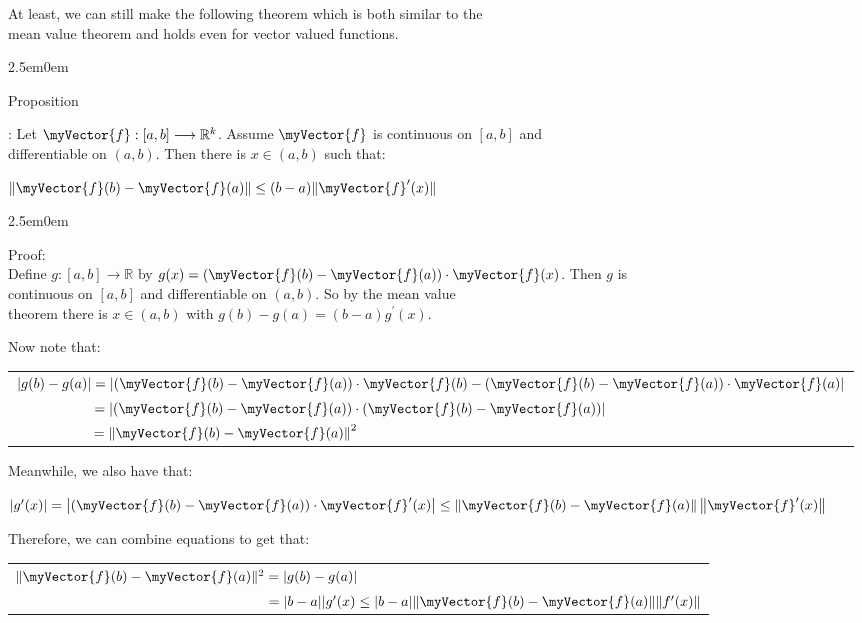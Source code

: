 \documentclass{book}
\newcommand{\hTwo}{%
   \color{MidnightBlue}%
   \fontsize{13}{15}\selectfont%
}
\newcommand{\hThree}{%
   \color{PineGreen!85!Orange}
   \fontsize{13}{15}\selectfont%
}
\newenvironment{myIndent}{%
   \begin{adjustwidth}{2.5em}{0em}%
}{%
   \end{adjustwidth}%
}
\newcounter{PropNumber}
\newcommand{\propCount}[1][1]{%
   \addtocounter{PropNumber}{#1}%
   \thePropNumber%
}
\newcommand{\retTwo}{\hfill\bigbreak}
\newcommand{\mVec}[1]{\myVector{#1}}
\begin{document}
At least, we can still make the following theorem which is both similar to the\\ mean value theorem and holds even for vector valued functions.
{\begin{myIndent}\hTwo
   Proposition \propCount: Let $\mVec{f}: [a, b] \longrightarrow \mathbb{R}^k$. Assume $\mVec{f}$ is continuous on $[a, b]$ and\\ differentiable on $(a, b)$. Then there is $x \in (a, b)$ such that:

   {\centering $\|\mVec{f}(b) - \mVec{f}(a)\| \leq (b-a)\|\mVec{f}^\prime(x)\|$\retTwo\par}

   {\begin{myIndent}\hThree
      Proof:\\
      Define $g: [a, b] \longrightarrow \mathbb{R}$ by $g(x) = (\mVec{f}(b) - \mVec{f}(a)) \cdot \mVec{f}(x)$. Then $g$ is\\ continuous on $[a, b]$ and differentiable on $(a, b)$. So by the mean value\\ theorem there is $x \in (a, b)$ with $g(b) - g(a) = (b-a)g^\prime(x)$.\retTwo

      Now note that:\\
      \begin{tabular}{l}
         $\left|g(b) - g(a)\right| = \left|\left(\mVec{f}(b) - \mVec{f}(a)\right)\cdot\mVec{f}(b) - \left(\mVec{f}(b) - \mVec{f}(a)\right)\cdot\mVec{f}(a)\right|$\\ [10pt]
         $\phantom{\left|g(b) - g(a)\right|} = \left|\left(\mVec{f}(b) - \mVec{f}(a)\right)\cdot\left(\mVec{f}(b) - \mVec{f}(a)\right)\right|$\\ [8pt]
         $\phantom{\left|g(b) - g(a)\right|} = \left\|\mVec{f}(b) - \mVec{f}(a)\right\|^2$
      \end{tabular}\retTwo

      Meanwhile, we also have that:
      
      {\centering $|g^\prime(x)| = \left|\left(\mVec{f}(b) - \mVec{f}(a)\right)\cdot\mVec{f}^\prime(x)\right| \leq \left\|\mVec{f}(b) - \mVec{f}(a)\right\|\left\|\mVec{f}^\prime(x)\right\| $ \retTwo\par}

      Therefore, we can combine equations to get that:

      {\centering 
      \begin{tabular}{l}
         $\|\mVec{f}(b) - \mVec{f}(a)\|^2 = |g(b) - g(a)|$\\
         $\phantom{\|\mVec{f}(b) - \mVec{f}(a)\|^2} = |b-a||g^\prime(x) \leq |b-a|\|\mVec{f}(b) - \mVec{f}(a)\|\|f^\prime(x)\|$
      \end{tabular}\retTwo\par}


\end{myIndent}}
\end{myIndent}}
\end{document}
